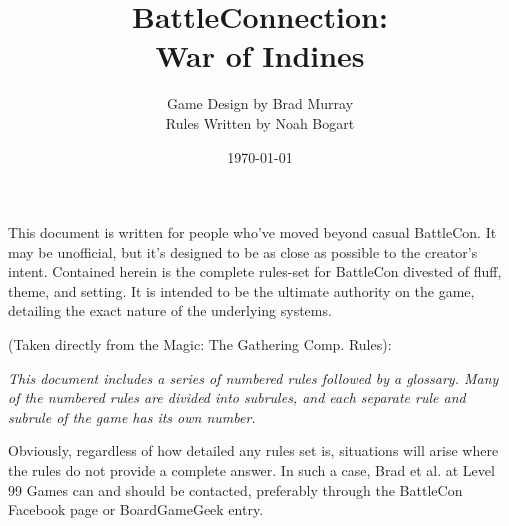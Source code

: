 \documentclass[11pt]{article}
\begin{document}

\renewcommand{\theenumi}{~\thesection \ifnum\value{enumi}<10 0\fi\arabic{enumi}.}
\renewcommand{\labelenumi}{\theenumi}

\renewcommand{\theenumii}{~\thesection \ifnum\value{enumi}<10 0\fi\arabic{enumi}.\arabic{enumii}.}
\renewcommand{\labelenumii}{\theenumii}

\renewcommand{\theenumiii}{~\thesection \ifnum\value{enumi}<10 0\fi\arabic{enumi}.\arabic{enumii}\alph{enumiii}.}
\renewcommand{\labelenumiii}{\theenumiii}

\newcommand{\gamerule}[2]{\begin{enumerate*}\setcounter{enumi}{\value{rulecounter}} \item #1 #2\end{enumerate*}\stepcounter{rulecounter}}
\newcommand{\subrules}[1]{\begin{enumerate*} #1 \end{enumerate*}}
\newcommand{\subsubrules}[1]{\begin{enumerate*} #1 \end{enumerate*}}

\title{BattleConnection:\\War of Indines}
\author{Game Design by Brad Murray\\Rules Written by Noah Bogart}
\date{\today}
\maketitle
This document is written for people who've moved beyond casual BattleCon. It may be unofficial, but it's designed to be as close as possible to the creator's intent.  Contained herein is the complete rules-set for BattleCon divested of fluff, theme, and setting. It is intended to be the ultimate authority on the game, detailing the exact nature of the underlying systems.

(Taken directly from the Magic: The Gathering Comp. Rules):

\emph{This document includes a series of numbered rules followed by a glossary. Many of the numbered rules are divided into subrules, and each separate rule and subrule of the game has its own number.}

Obviously, regardless of how detailed any rules set is, situations will arise where the rules do not provide a complete answer. In such a case, Brad et al. at Level 99 Games can and should be contacted, preferably through the BattleCon Facebook page or BoardGameGeek entry.
\end{document}
